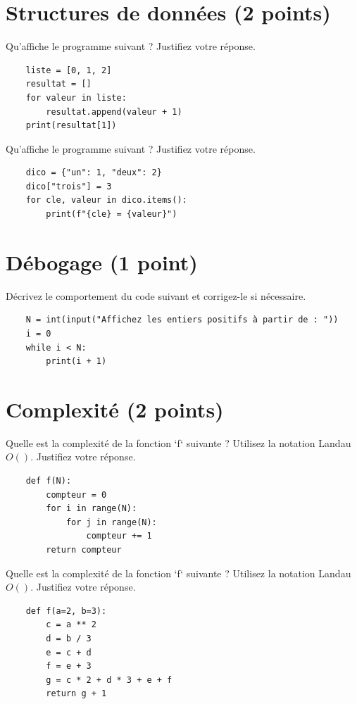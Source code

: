 \documentclass{exam}
\begin{document}
\section{Structures de données \small{(2 points)}}
\begin{questions}
    \question Qu'affiche le programme suivant ? Justifiez votre réponse.
    \begin{verbatim}
    liste = [0, 1, 2]
    resultat = []
    for valeur in liste:
        resultat.append(valeur + 1)
    print(resultat[1])
    \end{verbatim}
    \vspace*{1cm}

    \question Qu'affiche le programme suivant ? Justifiez votre réponse.
    \begin{verbatim}
    dico = {"un": 1, "deux": 2}
    dico["trois"] = 3
    for cle, valeur in dico.items():
        print(f"{cle} = {valeur}")
    \end{verbatim}
    \vspace*{1cm}
\end{questions}

\section{Débogage \small{(1 point)}}
\begin{questions}
    \question Décrivez le comportement du code suivant et corrigez-le si nécessaire.
    \begin{verbatim}
    N = int(input("Affichez les entiers positifs à partir de : "))
    i = 0
    while i < N:
        print(i + 1)
    \end{verbatim}
    \vspace*{1cm}
\end{questions}

\section{Complexité \small{(2 points)}}
\begin{questions}
    \question Quelle est la complexité de la fonction `f` suivante ? Utilisez la notation Landau $O()$. Justifiez votre réponse.
    \begin{verbatim}
    def f(N):
        compteur = 0
        for i in range(N):
            for j in range(N):
                compteur += 1
        return compteur
    \end{verbatim}
    \vspace*{1cm}

    \question Quelle est la complexité de la fonction `f` suivante ? Utilisez la notation Landau $O()$. Justifiez votre réponse.
    \begin{verbatim}
    def f(a=2, b=3):
        c = a ** 2
        d = b / 3
        e = c + d
        f = e + 3
        g = c * 2 + d * 3 + e + f
        return g + 1
    \end{verbatim}
    \vspace*{1cm}
\end{questions}
\end{document}
